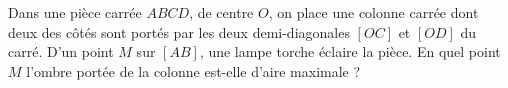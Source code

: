 Dans une pièce carrée $ABCD$, de centre $O$, on place une colonne carrée dont deux des côtés sont portés par les deux demi-diagonales $[OC]$ et $[OD]$ du carré. D'un point $M$ sur $[AB]$, une lampe torche éclaire la pièce. En quel point $M$ l'ombre portée de la colonne est-elle d'aire maximale ?
